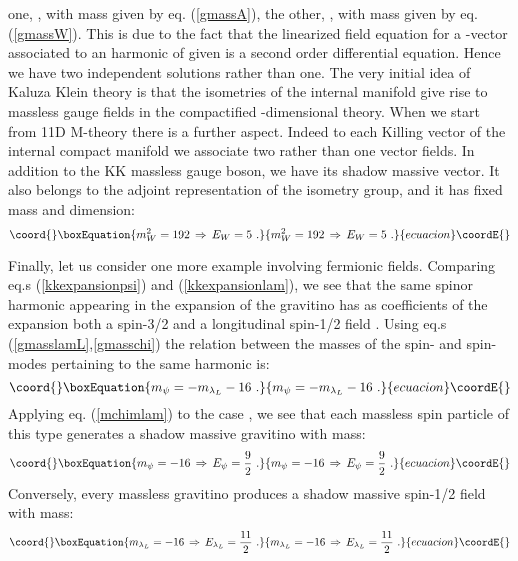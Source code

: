\documentclass[a4paper,11pt]{article}
\providecommand{\ft}[2]{{\textstyle\frac{#1}{#2}}}
\begin{document}
one, \coordHE{}, with mass given by eq. (\ref{gmassA}), the other,
\coordHE{}, with mass given by eq. (\ref{gmassW}). This is due to the
fact that the linearized field equation for a \coordHE{}-vector
associated to an harmonic of given \coordHE{} is a second
order differential equation. Hence we have two independent
solutions rather than one. The very initial idea of Kaluza Klein
theory is that the isometries of the internal manifold give rise
to massless gauge fields in the compactified \coordHE{}-dimensional
theory. When we start from 11D M-theory there is a further aspect.
Indeed to each Killing vector of the internal compact manifold we
associate two rather than one vector fields. In addition to the KK
massless gauge boson, we have its shadow massive vector. It also
belongs to the adjoint representation of the isometry group, and
it has fixed mass and dimension:
\begin{equation}\coord{}\boxEquation{
  m^2_W = 192 \, \Rightarrow \, E_W =5~.
\label{emme2w}
}{
  m^2_W = 192 \, \Rightarrow \, E_W =5~.
}{ecuacion}\coordE{}\end{equation}
\par
Finally, let us consider one more example involving fermionic
fields. Comparing eq.s (\ref{kkexpansionpsi}) and
(\ref{kkexpansionlam}), we see that the same spinor harmonic
\coordHE{} appearing in the expansion of the gravitino \coordHE{}
has as coefficients of the expansion both a spin-3/2 \coordHE{}
and a longitudinal spin-1/2 field \coordHE{}. Using eq.s
(\ref{gmasslamL},\ref{gmasschi}) the relation between the masses
of the spin-\coordHE{}  and spin-\coordHE{} modes pertaining to the same
harmonic is:
\begin{equation}\coord{}\boxEquation{
  m_\psi=-m_{\lambda_L} -16~.
\label{mchimlam}
}{
  m_\psi=-m_{\lambda_L} -16~.
}{ecuacion}\coordE{}\end{equation}
Applying eq. (\ref{mchimlam}) to the case \coordHE{}, we
see that each massless spin \myHighlight{$\ft 12$}\coordHE{} particle of this type
generates a shadow massive gravitino with mass:
\begin{equation}\coord{}\boxEquation{
  m_\psi = -16 \, \Rightarrow \, E_\psi= \frac 9 2 ~.
\label{mchi92}
}{
  m_\psi = -16 \, \Rightarrow \, E_\psi= \frac 9 2 ~.
}{ecuacion}\coordE{}\end{equation}
Conversely, every massless gravitino produces a shadow massive
spin-1/2 field with mass:
\begin{equation}\coord{}\boxEquation{
  m_{\lambda _L} = -16 \, \Rightarrow \, E_{\lambda _L}= \frac {11}2~.
\label{mlam112}
}{
  m_{\lambda _L} = -16 \, \Rightarrow \, E_{\lambda _L}= \frac {11}2~.
}{ecuacion}\coordE{}\end{equation}
%
\end{document}
